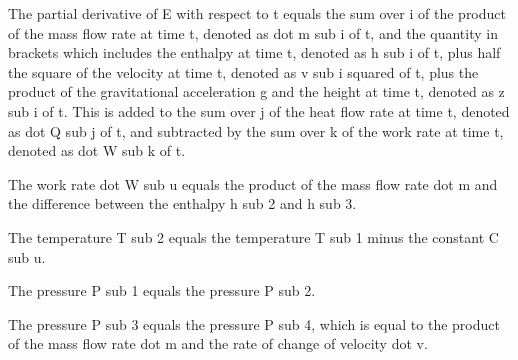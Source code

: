 The partial derivative of E with respect to t equals the sum over i of the product of the mass flow rate at time t, denoted as dot m sub i of t, and the quantity in brackets which includes the enthalpy at time t, denoted as h sub i of t, plus half the square of the velocity at time t, denoted as v sub i squared of t, plus the product of the gravitational acceleration g and the height at time t, denoted as z sub i of t. This is added to the sum over j of the heat flow rate at time t, denoted as dot Q sub j of t, and subtracted by the sum over k of the work rate at time t, denoted as dot W sub k of t.

The work rate dot W sub u equals the product of the mass flow rate dot m and the difference between the enthalpy h sub 2 and h sub 3.

The temperature T sub 2 equals the temperature T sub 1 minus the constant C sub u.

The pressure P sub 1 equals the pressure P sub 2.

The pressure P sub 3 equals the pressure P sub 4, which is equal to the product of the mass flow rate dot m and the rate of change of velocity dot v.
